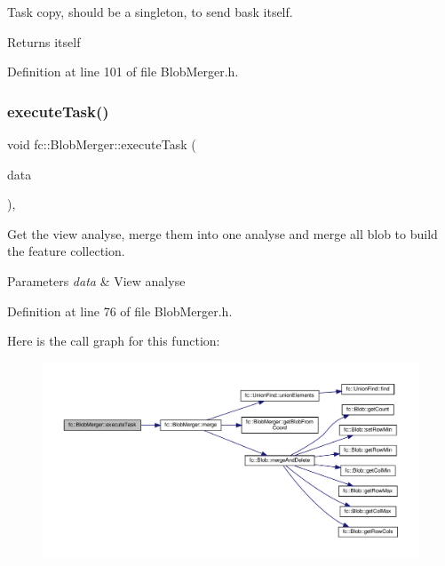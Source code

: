 Task copy, should be a singleton, to send bask itself. 

\begin{DoxyReturn}{Returns}
itself 
\end{DoxyReturn}


Definition at line 101 of file Blob\+Merger.\+h.

\mbox{\label{classfc_1_1BlobMerger_a81af854864e9ae220ad7c5fed0eef195}} 
\subsubsection{\texorpdfstring{execute\+Task()}{executeTask()}}
{\footnotesize\ttfamily void fc\+::\+Blob\+Merger\+::execute\+Task (\begin{DoxyParamCaption}\item[{std\+::shared\+\_\+ptr$<$ \hyperlink{classfc_1_1ViewAnalyse}{View\+Analyse} $>$}]{data }\end{DoxyParamCaption})\hspace{0.3cm}{\ttfamily [inline]}, {\ttfamily [override]}}



Get the view analyse, merge them into one analyse and merge all blob to build the feature collection. 


\begin{DoxyParams}{Parameters}
{\em data} & View analyse \\
\hline
\end{DoxyParams}


Definition at line 76 of file Blob\+Merger.\+h.

Here is the call graph for this function\+:
\nopagebreak
\begin{figure}[H]
\begin{center}
\leavevmode
\includegraphics[width=350pt]{d3/df4/classfc_1_1BlobMerger_a81af854864e9ae220ad7c5fed0eef195_cgraph}
\end{center}
\end{figure}
\mbox{\label{classfc_1_1BlobMerger_ac2e61560c60b1467e385a3d08577c650}} 
